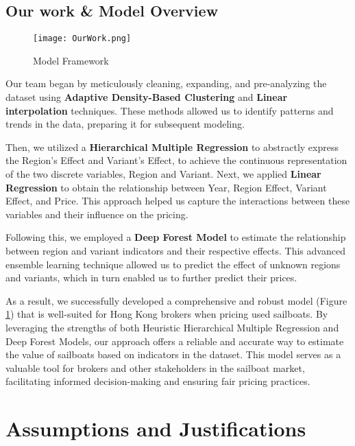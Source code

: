 \documentclass[12pt]{article}  %
\begin{document}
\subsection{Our work \& Model Overview}
\begin{figure}[htbp]
    \centering
    \texttt{[image: OurWork.png]}
    \caption{Model Framework}\label{fig:OurWork}
\end{figure}
Our team began by meticulously cleaning, expanding, and pre-analyzing the dataset using \textbf{Adaptive Density-Based Clustering} and \textbf{Linear interpolation} techniques. These methods allowed us to identify patterns and trends in the data, preparing it for subsequent modeling.

Then, we utilized a \textbf{Hierarchical Multiple Regression} to abstractly express the Region's Effect and Variant's Effect, to achieve the continuous representation of the two discrete variables, Region and Variant. Next, we applied \textbf{Linear Regression} to obtain the relationship between Year, Region Effect, Variant Effect, and Price. This approach helped us capture the interactions between these variables and their influence on the pricing.

Following this, we employed a \textbf{Deep Forest Model} to estimate the relationship between region and variant indicators and their respective effects. This advanced ensemble learning technique allowed us to predict the effect of unknown regions and variants, which in turn enabled us to further predict their prices.

As a result, we successfully developed a comprehensive and robust model (Figure \ref{fig:OurWork}) that is well-suited for Hong Kong brokers when pricing used sailboats. By leveraging the strengths of both Heuristic Hierarchical Multiple Regression and Deep Forest Models, our approach offers a reliable and accurate way to estimate the value of sailboats based on indicators in the dataset. This model serves as a valuable tool for brokers and other stakeholders in the sailboat market, facilitating informed decision-making and ensuring fair pricing practices.

\section{Assumptions and Justifications}
\end{document}
